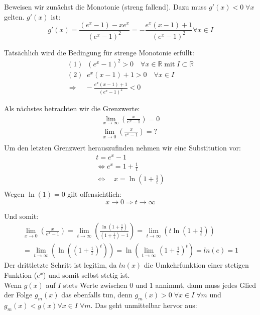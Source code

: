 \documentclass[a4paper,german,12pt,smallheadings]{scrartcl}
\begin{document}
Beweisen wir zunächst die Monotonie (streng fallend). Dazu muss $g'(x)<0 \; \forall x$ gelten. $g'(x)$ ist:
\begin{equation*}
g'(x)=\frac{(e^x-1)-xe^x}{(e^x-1)^2}=-\frac{e^x(x-1)+1}{(e^x-1)^2} \forall x\in I
\end{equation*}

Tatsächlich wird die Bedingung für strenge Monotonie erfüllt:
\begin{align*}
(1)\;\; (e^x-1)^2 > 0 \quad \forall x\in\mathbb{R}\; \text{mit}\; I\subset\mathbb{R}\\
(2)\;\; e^x(x-1)+1 > 0 \quad \forall x \in I\\
\Rightarrow \quad -\frac{e^x(x-1)+1}{(e^x-1)^2}<0
\end{align*}

Als nächstes betrachten wir die Grenzwerte:
\begin{align*}
\lim\limits_{x \to \infty}\left(\frac{x}{e^x-1}\right)=0\\
\lim\limits_{x \to 0}\left(\frac{x}{e^x-1}\right)=?\\
\end{align*}
Um den letzten Grenzwert herauszufinden nehmen wir eine Substitution vor:
\begin{align*}
t=e^x-1\\
\Leftrightarrow e^x=1+\frac{1}{t}\\
\Leftrightarrow \quad x=\ln(1+\frac{1}{t})\\
\end{align*}
Wegen $\ln(1)=0$ gilt offensichtlich:
\begin{equation*}
x\rightarrow0 \Rightarrow t\rightarrow \infty
\end{equation*}

Und somit:
\begin{align*}
\lim\limits_{x \to 0}\left(\frac{x}{e^x-1}\right)=\lim\limits_{t \to \infty}\left(\frac{\ln(1+\frac{1}{t})}{\left(1+\frac{1}{t}\right)-1}\right)=\lim\limits_{t\to\infty}\left(t\ln(1+\frac{1}{t})\right)\\
=\lim\limits_{t\to\infty}\left(\ln\left(\left(1+\frac{1}{t}\right)^t\right)\right)=\ln\left(\lim\limits_{t \to \infty}\left(1+\frac{1}{t}\right)^t\right)=ln(e)=1
\end{align*}
Der drittletzte Schritt ist legitim, da $ln(x)$ die Umkehrfunktion einer stetigen Funktion ($e^x$) und somit selbst stetig ist.\\
Wenn $g(x)$ auf $I$ stets Werte zwischen 0 und 1 annimmt, dann muss jedes Glied der Folge $g_m(x)$ das ebenfalls tun, denn $g_m(x) > 0 \; \forall x\in I \; \forall m$ und $g_m(x) < g(x) \forall x\in I \; \forall m$. Das geht unmittelbar hervor aus:
\end{document}
